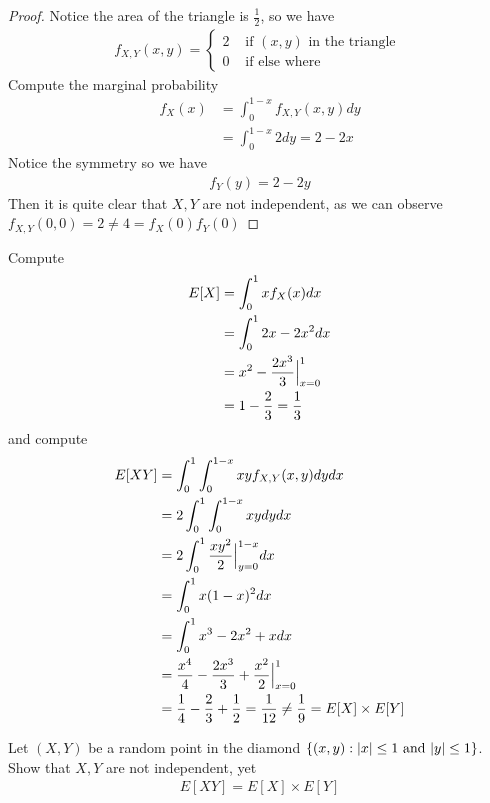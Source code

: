 \documentclass{report}
\begin{document}
\begin{proof}
Notice the area of the triangle is $\frac{1}{2}$, so we have 
\begin{align*}
f_{X,Y}(x,y)=\begin{cases}
  2& \text{ if $(x,y)$ in the triangle }\\
  0& \text{ if else where }
\end{cases}
\end{align*}
Compute the marginal probability 
\begin{align*}
f_X(x)&=\int_0^{1-x} f_{X,Y}(x,y)dy\\
&=\int_0^{1-x} 2dy=2-2x
\end{align*}
Notice the symmetry so we have 
\begin{align*}
f_Y(y)=2-2y
\end{align*}
Then it is quite clear that $X,Y$ are not independent, as we can observe  $f_{X,Y}(0,0)=2\neq 4=f_X(0)f_Y(0)$
\end{proof}
Compute 
\begin{align*}
E[X]&=\int_0^1 x f_X(x)dx\\
&=\int_0^1 2x-2x^2 dx\\
&=x^2-\frac{2x^3}{3}\Big |_{x=0}^1\\
&=1-\frac{2}{3}=\frac{1}{3}
\end{align*}
and compute 
\begin{align*}
E[XY]&=\int_0^1\int_0^{1-x} xy f_{X,Y}(x,y)dydx\\
&=2\int_0^1\int_0^{1-x}xydydx\\
&=2\int_0^1 \frac{xy^2}{2}\Big |_{y=0}^{1-x}dx\\
&=\int_0^1 x(1-x)^2 dx\\
&=\int_0^1 x^3-2x^2+xdx\\
&=\frac{x^4}{4}-\frac{2x^3}{3}+\frac{x^2}{2}\Big |_{x=0}^1\\
&=\frac{1}{4}-\frac{2}{3}+\frac{1}{2}=\frac{1}{12}\neq \frac{1}{9}=E[X]\times E[Y]
\end{align*}
\begin{question}{}{}
Let $(X,Y)$ be a random point in the diamond $\{ (x,y):
|x|\leq 1\text{ and }|y|\leq 1 \}$. Show that $X,Y$ are not independent, yet 
 \begin{align*}
E[XY]=E[X]\times E[Y]
\end{align*}
\end{question}
\end{document}
